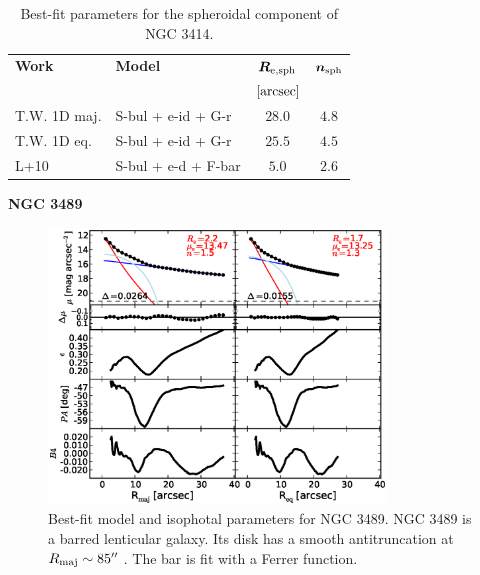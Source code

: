 \documentclass[preprint2]{emulateapj}
\newcommand{\fitfigurewidth}{0.8\textwidth}
\begin{document}
  \begin{table}[h]
  \small
  \caption{Best-fit parameters for the spheroidal component of NGC 3414.}
  \begin{center}
  \begin{tabular}{llcc}
  \hline
  {\bf Work} & {\bf Model}   & $\bm R_{\rm e,sph}$    & $\bm n_{\rm sph}$ \\
    &  &  $[\rm arcsec]$ & \\
  \hline
  T.W. 1D maj. & S-bul + e-id + G-r & $28.0$  &  $4.8$ \\
  T.W. 1D eq.  & S-bul + e-id + G-r & $25.5$  &  $4.5$ \\
  \hline
  L+10         & S-bul + e-d + F-bar	  & $5.0$  &  $2.6$ \\
  \hline
  \end{tabular}
  \end{center}
  \label{tab:n3414}
  \end{table}


  \clearpage\newpage\noindent
  {\bf NGC 3489 \\}

  \begin{figure}[h]
  \begin{center}
  \includegraphics[width=\fitfigurewidth]{images/n3489_1Dfit.eps}
  \caption{Best-fit model and isophotal parameters for NGC 3489.
  NGC 3489 is a barred lenticular galaxy. 
  Its disk has a smooth antitruncation at $R_{\rm maj} \sim 85''$ \citep{erwin2008}.
  The bar is fit with a Ferrer function.
  }
  \end{center}
  \end{figure}
\end{document}
